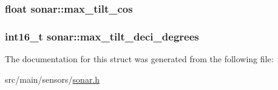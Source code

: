 \hypertarget{structsonar_a0e959719395f4985f2a794412b3e4fd1}{
\subsubsection[{max\+\_\+tilt\+\_\+cos}]{\setlength{\rightskip}{0pt plus 5cm}float sonar\+::max\+\_\+tilt\+\_\+cos}}\label{structsonar_a0e959719395f4985f2a794412b3e4fd1}
\hypertarget{structsonar_af0b72ab298a1e42840cfa419264c231e}{
\subsubsection[{max\+\_\+tilt\+\_\+deci\+\_\+degrees}]{\setlength{\rightskip}{0pt plus 5cm}int16\+\_\+t sonar\+::max\+\_\+tilt\+\_\+deci\+\_\+degrees}}\label{structsonar_af0b72ab298a1e42840cfa419264c231e}


The documentation for this struct was generated from the following file\+:\begin{DoxyCompactItemize}
\item 
src/main/sensors/\hyperlink{sonar_8h}{sonar.\+h}\end{DoxyCompactItemize}
